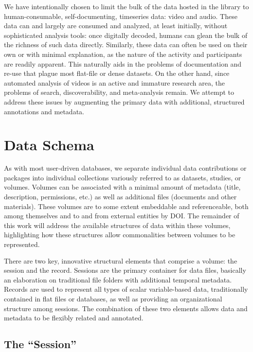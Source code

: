 \documentclass{sig-alternate}
\begin{document}
We have intentionally chosen to limit the bulk of the data hosted in the library to human-consumable, self-documenting, timeseries data: video and audio.
These data can and largely are consumed and analyzed, at least initially, without sophisticated analysis tools: once digitally decoded, humans can glean the bulk of the richness of such data directly.
Similarly, these data can often be used on their own or with minimal explanation, as the nature of the activity and participants are readily apparent.
This naturally aids in the problems of documentation and re-use that plague most flat-file or dense datasets.
On the other hand, since automated analysis of videos is an active and immature research area, the problems of search, discoverability, and meta-analysis remain.
We attempt to address these issues by augmenting the primary data with additional, structured annotations and metadata.

\section{Data Schema}

As with most user-driven databases, we separate individual data contributions or packages into individual collections variously referred to as datasets, studies, or volumes.
Volumes can be associated with a minimal amount of metadata (title, description, permissions, etc.) as well as additional files (documents and other materials).
These volumes are to some extent embeddable and referenceable, both among themselves and to and from external entities by DOI.
The remainder of this work will address the available structures of data within these volumes, highlighting how these structures allow commonalities between volumes to be represented.


There are two key, innovative structural elements that comprise a volume: the session and the record.
Sessions are the primary container for data files, basically an elaboration on traditional file folders with additional temporal metadata.
Records are used to represent all types of scalar variable-based data, traditionally contained in flat files or databases, as well as providing an organizational structure among sessions.
The combination of these two elements allows data and metadata to be flexibly related and annotated.

\subsection{The ``Session''}
\end{document}
